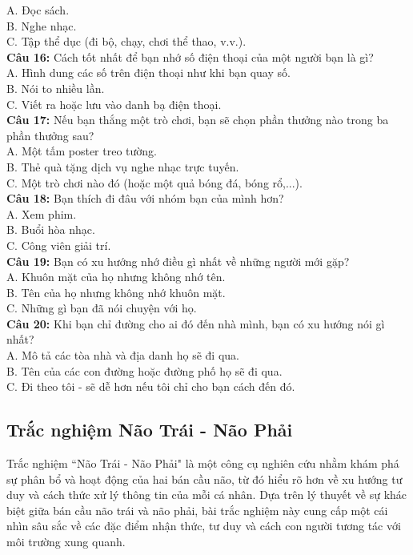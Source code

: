 \begin{multicols}{2}
A. Đọc sách. \\
B. Nghe nhạc. \\
C. Tập thể dục (đi bộ, chạy, chơi thể thao, v.v.). \\
\textbf{Câu 16:} Cách tốt nhất để bạn nhớ số điện thoại của một người bạn là gì? \\
A. Hình dung các số trên điện thoại như khi bạn quay số. \\
B. Nói to nhiều lần. \\
C. Viết ra hoặc lưu vào danh bạ điện thoại. \\
\textbf{Câu 17:} Nếu bạn thắng một trò chơi, bạn sẽ chọn phần thưởng nào trong ba phần thưởng sau? \\
A. Một tấm poster treo tường. \\
B. Thẻ quà tặng dịch vụ nghe nhạc trực tuyến. \\
C. Một trò chơi nào đó (hoặc một quả bóng đá, bóng rổ,...). \\
\textbf{Câu 18:} Bạn thích đi đâu với nhóm bạn của mình hơn? \\
A. Xem phim. \\
B. Buổi hòa nhạc. \\
C. Công viên giải trí. \\
\textbf{Câu 19:} Bạn có xu hướng nhớ điều gì nhất về những người mới gặp? \\
A. Khuôn mặt của họ nhưng không nhớ tên. \\
B. Tên của họ nhưng không nhớ khuôn mặt. \\
C. Những gì bạn đã nói chuyện với họ. \\
\textbf{Câu 20:} Khi bạn chỉ đường cho ai đó đến nhà mình, bạn có xu hướng nói gì nhất? \\
A. Mô tả các tòa nhà và địa danh họ sẽ đi qua. \\
B. Tên của các con đường hoặc đường phố họ sẽ đi qua. \\
C. Đi theo tôi - sẽ dễ hơn nếu tôi chỉ cho bạn cách đến đó.\\
\end{multicols}


\subsection{Trắc nghiệm Não Trái - Não Phải}

Trắc nghiệm ``Não Trái - Não Phải" là một công cụ nghiên cứu nhằm khám phá sự phân bổ và hoạt động của hai bán cầu não, từ đó hiểu rõ hơn về xu hướng tư duy và cách thức xử lý thông tin của mỗi cá nhân. Dựa trên lý thuyết về sự khác biệt giữa bán cầu não trái và não phải, bài trắc nghiệm này cung cấp một cái nhìn sâu sắc về các đặc điểm nhận thức, tư duy và cách con người tương tác với môi trường xung quanh.

